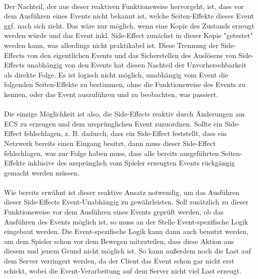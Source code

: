 \documentclass[11pt]{article}
\begin{document}
    \paragraph{}
    Der Nachteil, der aus dieser reaktiven Funktionsweise hervorgeht, ist,
    dass vor dem Ausführen eines Events nicht bekannt ist,
    welche Seiten-Effekte dieses Event ggf. nach sich zieht.
    Das wäre nur möglich, wenn eine Kopie des Zustands erzeugt werden würde und
    das Event inkl. Side-Effect zunächst in dieser Kopie "getestet" werden kann,
    was allerdings nicht praktikabel ist.
    Diese Trennung der Side-Effects von den eigentlichen Events und das
    Sicherstellen des Auslösens von Side-Effects unabhängig von den Events hat
    diesen Nachteil der Unvorhersehbarkeit als direkte Folge.
    Es ist logisch nicht möglich, unabhängig vom Event die folgenden
    Seiten-Effekte zu bestimmen, ohne die Funktionsweise des Events zu kennen,
    oder das Event auszuführen und zu beobachten, was passiert.

    \paragraph{}
    Die einzige Möglichkeit ist also, die Side-Effects reaktiv durch Änderungen
    am ECS zu erzeugen und dem ursprünglichen Event zuzuordnen.
    Sollte ein Side-Effect fehlschlagen, z. B. dadurch, dass ein Side-Effect
    feststellt, dass ein Netzwerk bereits einen Eingang besitzt,
    dann muss dieser Side-Effect fehlschlagen, was zur Folge haben muss,
    dass alle bereits ausgeführten Seiten-Effekte inklusive des ursprünglich vom
    Spieler erzeugten Events rückgängig gemacht werden müssen.

    \paragraph{}
    Wie bereits erwähnt ist dieser reaktive Ansatz notwendig,
    um das Ausführen dieser Side-Effects Event-Unabhängig zu gewährleisten.
    Soll zusätzlich zu dieser Funktionsweise vor dem Ausführen eines Events geprüft werden,
    ob das Ausführen des Events möglich ist,
    so muss an der Stelle Event-spezifische Logik eingebaut werden.
    Die Event-spezifische Logik kann dann auch benutzt werden,
    um dem Spieler schon vor dem
    Bewegen mitzuteilen, dass diese Aktion aus diesem und jenem Grund nicht möglich ist.
    So kann außerdem noch die Last auf dem Server verringert werden,
    da der Client das Event schon gar nicht erst schickt,
    wobei die Event-Verarbeitung auf dem Server nicht viel Last erzeugt.
\end{document}

